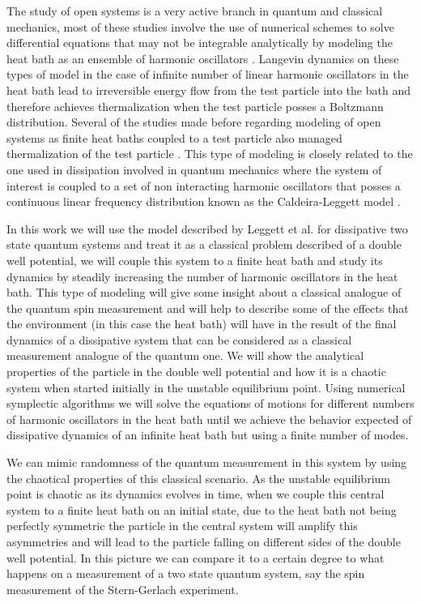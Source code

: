 The study of open systems is a very active branch in quantum and classical mechanics, most of these studies involve the use of numerical schemes to solve differential equations that may not be integrable analytically by modeling the heat bath as an ensemble of harmonic oscillators \cite{flambaum1997statistical}\cite{flambaum1997distribution}\cite{mazur1960poincare}.  Langevin dynamics on these types of model in the case of infinite number of linear harmonic oscillators in the heat bath lead to irreversible energy flow from the test particle into the bath and therefore achieves thermalization when the test particle posses a Boltzmann distribution. Several of the studies made before regarding modeling of open systems as finite heat baths coupled to a test particle also managed thermalization of the test particle \cite{flambaum1997statistical}\cite{ford1998radiating}\cite{smith2008thermalization}\cite{hasegawa2011classical}. This type of modeling is closely related to the one used in dissipation involved in quantum mechanics where the system of interest is coupled to a set of non interacting harmonic oscillators that posses a continuous linear frequency distribution known as the Caldeira-Leggett model \cite{caldeira1983quantum}. \par

In this work we will use the model described by Leggett et al. \cite{leggett1987dynamics} for dissipative two state quantum systems and treat it as a classical problem described of a double well potential, we will couple this system to a finite heat bath and study its dynamics by steadily increasing the number of harmonic oscillators in the heat bath. This type of modeling will give some insight about a classical analogue of the quantum spin measurement and will help to describe some of the effects that the environment (in this case the heat bath) will have in the result of the final dynamics of a dissipative system that can be considered as a classical measurement analogue of the quantum one. We will show the analytical properties of the particle in the double well potential and how it is a chaotic system when started initially in the unstable equilibrium point. Using numerical symplectic algorithms we will solve the equations of motions for different numbers of harmonic oscillators in the heat bath until we achieve the behavior expected of dissipative dynamics of an infinite heat bath but using a finite number of modes.

We can mimic randomness of the quantum measurement in this system by using the chaotical properties of this classical scenario. As the unstable equilibrium point is chaotic as its dynamics evolves in time, when we couple this central system to a finite heat bath on an initial  state, due to the heat bath not being perfectly symmetric the particle in the central system will amplify this asymmetries and will lead to the particle falling on different sides of the double well potential. In this picture we can compare it to a certain degree to what happens on a measurement of a two state quantum system, say the spin measurement of the Stern-Gerlach experiment.

